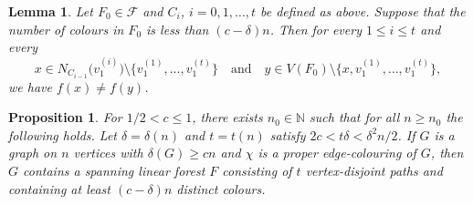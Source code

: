 \documentclass[10pt,a4paper]{amsart}
\newtheorem{proposition}{Proposition}
\newtheorem{lemma}{Lemma}
\renewcommand\ge{\geqslant}
\renewcommand\le{\leqslant}
\begin{document}
\begin{lemma}\label{lem:keyobs}
Let $F_0\in\mathcal F$ and $C_i$, $i=0,1,\ldots,t$ be defined as above. 
Suppose that the number of colours in $F_0$ is less than $(c-\delta)n$.
Then for every $1\le i\le t$ and every
\[
x\in N_{C_{i-1}}\!\big(v_1^{(i)}\big)\setminus \{v_1^{(1)},\ldots,v_1^{(t)}\} \quad\text{and}\quad
y\in V(F_0)\setminus\{x,v_1^{(1)},\ldots,v_1^{(t)}\},
\]
we have $f(x)\neq f(y)$.
\end{lemma}

\begin{proposition}\label{prop:pathforest}
For $1/2<c\le 1$, there exists $n_0\in\mathbb N$ such that for all $n\ge n_0$ the following holds. Let $\delta=\delta(n)$ and $t=t(n)$ satisfy $2c<t\delta<\delta^2 n/2$. If $G$ is a graph on $n$ vertices with $\delta(G)\ge cn$ and $\chi$ is a proper edge-colouring of $G$, then $G$ contains a spanning linear forest $F$ consisting of $t$ vertex-disjoint paths and containing at least $(c-\delta)n$ distinct colours.
\end{proposition}
\end{document}
